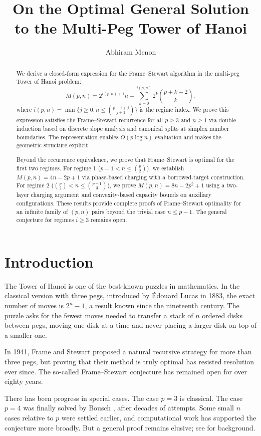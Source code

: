 \documentclass[11pt]{article}
\title{On the Optimal General Solution to the Multi-Peg Tower of Hanoi}
\author{Abhiram Menon}
\date{}
\theoremstyle{definition}
\begin{document}
\maketitle

\begin{abstract}
We derive a closed-form expression for the Frame--Stewart algorithm in the multi-peg Tower of Hanoi problem:
\[
M(p,n) = 2^{i(p,n)+1}n - \sum_{k=0}^{i(p,n)} 2^k \binom{p+k-2}{k},
\]
where $i(p,n) = \min\{j \geq 0 : n \leq \binom{p-1+j}{j+1}\}$ is the regime index. We prove this expression satisfies the Frame--Stewart recurrence for all $p \geq 3$ and $n \geq 1$ via double induction based on discrete slope analysis and canonical splits at simplex number boundaries. The representation enables $O(p \log n)$ evaluation and makes the geometric structure explicit.

Beyond the recurrence equivalence, we prove that Frame--Stewart is optimal for the first two regimes. For regime 1 ($p-1 < n \leq \binom{p}{2}$), we establish $M(p,n) = 4n - 2p + 1$ via phase-based charging with a borrowed-target construction. For regime 2 ($\binom{p}{2} < n \leq \binom{p+1}{3}$), we prove $M(p,n) = 8n - 2p^2 + 1$ using a two-layer charging argument and convexity-based capacity bounds on auxiliary configurations. These results provide complete proofs of Frame--Stewart optimality for an infinite family of $(p,n)$ pairs beyond the trivial case $n \leq p-1$. The general conjecture for regimes $i \geq 3$ remains open.
\end{abstract}

\section{Introduction}

The Tower of Hanoi is one of the best-known puzzles in mathematics. In the classical version with three pegs, introduced by Édouard Lucas in 1883, the exact number of moves is $2^n - 1$, a result known since the nineteenth century. The puzzle asks for the fewest moves needed to transfer a stack of $n$ ordered disks between pegs, moving one disk at a time and never placing a larger disk on top of a smaller one.

In 1941, Frame and Stewart proposed a natural recursive strategy for more than three pegs, but proving that their method is truly optimal has resisted resolution ever since. The so-called Frame--Stewart conjecture has remained open for over eighty years.

There has been progress in special cases. The case $p = 3$ is classical. The case $p = 4$ was finally solved by Bousch \cite{bousch2014}, after decades of attempts. Some small $n$ cases relative to $p$ were settled earlier, and computational work has supported the conjecture more broadly. But a general proof remains elusive; see \cite{hinz2018} for background.
\end{document}

